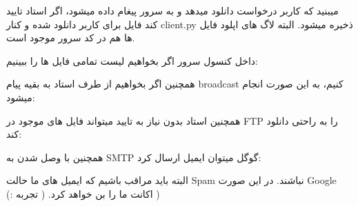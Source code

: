 میبنید که کاربر درخواست دانلود میدهد و به سرور پیغام داده میشود، اگر استاد تایید کند فایل برای کاربر دانلود شده و کنار client.py ذخیره میشود. البته لاگ های اپلود فایل ها هم در کد سرور موجود است.


داخل کنسول سرور اگر بخواهیم لیست تمامی فایل ها را ببینیم:

{
}


همچنین اگر بخواهیم از طرف استاد به بقیه پیام broadcast کنیم، به این صورت انجام میشود:

{
}


\pagebreak


همچنین استاد بدون نیاز به تایید میتواند فایل های موجود در FTP را به راحتی دانلود کند:


{
}

همچنین با وصل شدن به SMTP گوگل میتوان ایمیل ارسال کرد:

{
}


البته باید مراقب باشیم که ایمیل های ما حالت Spam نباشند. در این صورت Google اکانت ما را بن خواهد کرد. (  تجربه :)  )




